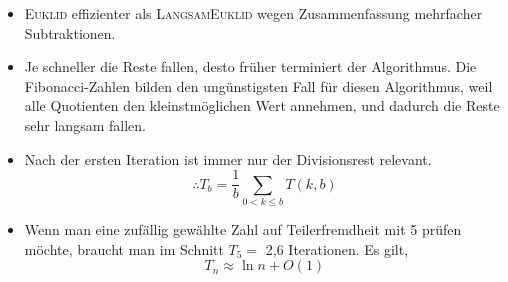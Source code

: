 \documentclass[12pt]{article}
\begin{document}
\begin{itemize}
\begin{center}
	\end{center}
	\vspace{10pt}
	\item \textsc{Euklid} effizienter als \textsc{LangsamEuklid} wegen Zusammenfassung mehrfacher Subtraktionen.
	\item Je schneller die Reste fallen, desto fr\"uher terminiert der Algorithmus. Die Fibonacci-Zahlen bilden den ung\"unstigsten Fall f\"ur diesen Algorithmus, weil alle Quotienten den kleinstm\"oglichen Wert annehmen, und dadurch die Reste sehr langsam fallen.
	\item Nach der ersten Iteration ist immer nur der Divisionsrest relevant.
	$$\therefore T_{b} = \frac{1}{b} \sum_{0 < k\leq b} T(k,b)$$
	\item Wenn man eine zuf\"allig gew\"ahlte Zahl auf Teilerfremdheit mit 5 pr\"ufen m\"ochte, braucht man im Schnitt $T_5=$ 2,6 Iterationen. Es gilt,
	$$T_n \approx \ln{n} + O(1)$$
\end{itemize}
\end{document}

